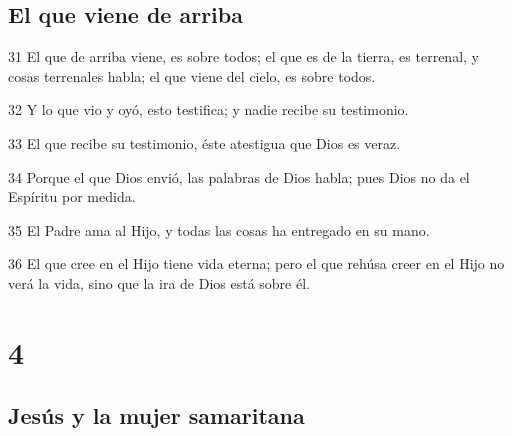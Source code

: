 \section*{El que viene de arriba}

\par 31 El que de arriba viene, es sobre todos; el que es de la tierra, es terrenal, y cosas terrenales habla; el que viene del cielo, es sobre todos.
\par 32 Y lo que vio y oyó, esto testifica; y nadie recibe su testimonio.
\par 33 El que recibe su testimonio, éste atestigua que Dios es veraz.
\par 34 Porque el que Dios envió, las palabras de Dios habla; pues Dios no da el Espíritu por medida.
\par 35 El Padre ama al Hijo, y todas las cosas ha entregado en su mano.
\par 36 El que cree en el Hijo tiene vida eterna; pero el que rehúsa creer en el Hijo no verá la vida, sino que la ira de Dios está sobre él.

\chapter{4}

\section*{Jesús y la mujer samaritana}

